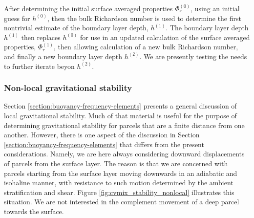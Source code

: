 After determining the initial surface averaged properties
$\Phi^{(0)}_{r}$, using an initial guess for $h^{(0)}$, then the bulk
Richardson number is used to determine the first nontrivial estimate
of the boundary layer depth, $h^{(1)}$.  The boundary layer depth
$h^{(1)}$ then replaces $h^{(0)}$ for use in an updated calculation of
the surface averaged properties, $\Phi^{(1)}_{r}$, then allowing
calculation of a new bulk Richardson number, and finally a new
boundary layer depth $h^{(2)}$.  We are presently testing the needs to
further iterate beyon $h^{(2)}$.



\subsubsection{Non-local gravitational stability}

Section \ref{section:buoyancy-frequency-elements} presents a general
discussion of local gravitational stability.  Much of that material is
useful for the purpose of determining gravitational stability for
parcels that are a finite distance from one another.  However, there
is one aspect of the discussion in Section
\ref{section:buoyancy-frequency-elements} that differs from the
present considerations.  Namely, we are here always considering
downward displacements of parcels from the surface layer.  The reason
is that we are concerned with parcels starting from the surface layer
moving downwards in an adiabatic and isohaline manner, with resistance
to such motion determined by the ambient stratification and shear.
Figure \ref{fig:cvmix_stability_nonlocal} illustrates this situation.
We are not interested in the complement movement of a deep parcel
towards the surface.


